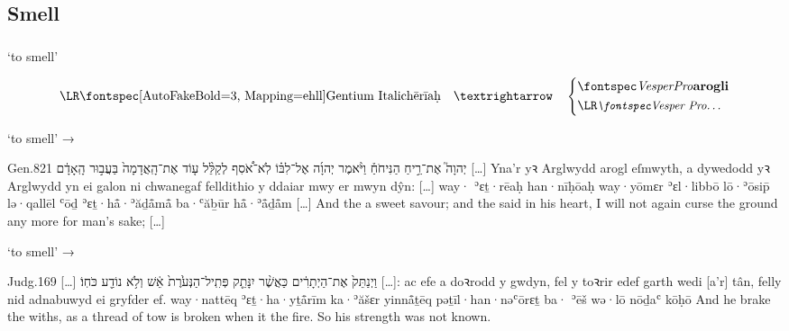 \subsection{Smell}




\subsubsection{}

\begin{frame}{ ‘to smell’}
	\begin{center}
		$$
		\mtext{\bh{hērīaḥ}} \transto
		\begin{dcases}
			\C{\hl{arogli}}\\
			\mtext{\small\C{…}}
		\end{dcases}
		$$
	\end{center}
\end{frame}


\begin{frame}{ ‘to smell’ → }
	\begin{example}{Gen.}{8}{21}{}{}
		\quoling
		{ יְהוָה֮ אֶת־רֵ֣יחַ הַנִּיחֹחַ֒ וַיֹּ֨אמֶר יְהוָ֜ה אֶל־לִבּ֗וֹ לֹֽא־אֹ֠סִף לְקַלֵּ֨ל ע֤וֹד אֶת־הָֽאֲדָמָה֙ בַּעֲב֣וּר הָֽאָדָ֔ם […]}
		{Yna’r  yꝛ Arglwydd arogl eſmwyth, a dywedodd yꝛ Arglwydd yn ei galon ni chwanegaf felldithio y ddaiar mwy er mwyn dŷn: […]}
		{way· {\YHWH} ʾɛṯ·rēaḥ han·nīḥōaḥ way·yōmɛr {\YHWH} ʾɛl·libbō lō·ʾōsip̄ lə·qallēl ʿōḏ ʾɛṯ·hå̄·ʾăḏå̄må̄ ba·ʿăḇūr hå̄·ʾå̄ḏå̄m […]}
		{And the {\LORD}  a sweet savour; and the {\LORD} said in his heart, I will not again curse the ground any more for man’s sake; […]}
	\end{example}
\end{frame}


\begin{frame}{ ‘to smell’ → }
	\begin{example}{Judg.}{16}{9}{}{}
		\quoling
		{[…] וַיְנַתֵּק֙ אֶת־הַיְתָרִ֔ים כַּאֲשֶׁ֨ר יִנָּתֵ֤ק פְּתִֽיל־הַנְּעֹ֙רֶת֙  אֵ֔שׁ וְלֹ֥א נוֹדַ֖ע כֹּחֽוֹ׃}
		{[…]: ac efe a doꝛrodd y gwdyn, fel y toꝛrir edef garth wedi  tân, felly nid adnabuwyd ei gryfder ef.}
		{way·nattēq ʾɛṯ·ha·yṯå̄rīm ka·ʾăšɛr yinnå̄ṯēq pəṯīl·han·nəʿōrɛṯ ba· ʾēš wə·lō nōḏaʿ kōḥō}
		{And he brake the withs, as a thread of tow is broken when it  the fire. So his strength was not known.}
	\end{example}
\end{frame}



